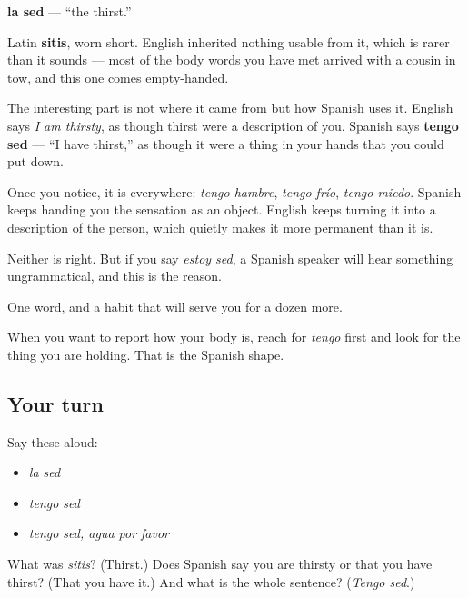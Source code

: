 \begin{cousinweb}
\textbf{la sed} — \textquotedblleft{}the thirst.\textquotedblright{}

Latin \textbf{sitis}, worn short. English inherited nothing usable from it, which is rarer than it sounds — most of the body words you have met arrived with a cousin in tow, and this one comes empty-handed.

The interesting part is not where it came from but how Spanish uses it. English says \emph{I am thirsty}, as though thirst were a description of you. Spanish says \textbf{tengo sed} — \textquotedblleft{}I have thirst,\textquotedblright{} as though it were a thing in your hands that you could put down.

Once you notice, it is everywhere: \emph{tengo hambre}, \emph{tengo frío}, \emph{tengo miedo}. Spanish keeps handing you the sensation as an object. English keeps turning it into a description of the person, which quietly makes it more permanent than it is.

Neither is right. But if you say \emph{estoy sed}, a Spanish speaker will hear something ungrammatical, and this is the reason.
\end{cousinweb}

\begin{grammarlens}[title={What you've built}]
One word, and a habit that will serve you for a dozen more.

When you want to report how your body is, reach for \emph{tengo} first and look for the thing you are holding. That is the Spanish shape.
\end{grammarlens}

\subsection*{Your turn}
Say these aloud:

\begin{itemize}
\raggedright
  \item \emph{la sed}
  \item \emph{tengo sed}
  \item \emph{tengo sed, agua por favor}
\end{itemize}

\begin{tcolorbox}[breakable,colback=teal!4,colframe=teal!35!black,title={Before you move on}]
What was \emph{sitis}? (Thirst.) Does Spanish say you are thirsty or that you have thirst? (That you have it.) And what is the whole sentence? (\emph{Tengo sed}.)
\end{tcolorbox}
